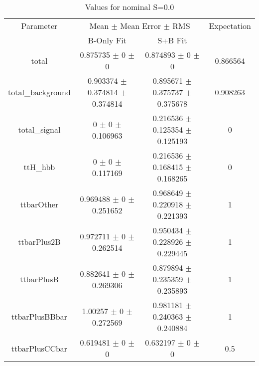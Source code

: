 \begin{table}
\centering
\caption{Values for nominal S=0.0}
\begin{tabular}{cccc}
\toprule
Parameter & \multicolumn{2}{c}{Mean $\pm$ Mean Error $\pm$ RMS} & Expectation\\
 & B-Only Fit & S+B Fit & \\
\midrule
total & \num{0.875735} $\pm$ \num{0} $\pm$ \num{0} & \num{0.874893} $\pm$ \num{0} $\pm$ \num{0} & \num{0.866564}\\
total\_background & \num{0.903374} $\pm$ \num{0.374814} $\pm$ \num{0.374814} & \num{0.895671} $\pm$ \num{0.375737} $\pm$ \num{0.375678} & \num{0.908263}\\
total\_signal & \num{0} $\pm$ \num{0} $\pm$ \num{0.106963} & \num{0.216536} $\pm$ \num{0.125354} $\pm$ \num{0.125193} & \num{0}\\
ttH\_hbb & \num{0} $\pm$ \num{0} $\pm$ \num{0.117169} & \num{0.216536} $\pm$ \num{0.168415} $\pm$ \num{0.168265} & \num{0}\\
ttbarOther & \num{0.969488} $\pm$ \num{0} $\pm$ \num{0.251652} & \num{0.968649} $\pm$ \num{0.220918} $\pm$ \num{0.221393} & \num{1}\\
ttbarPlus2B & \num{0.972711} $\pm$ \num{0} $\pm$ \num{0.262514} & \num{0.950434} $\pm$ \num{0.228926} $\pm$ \num{0.229445} & \num{1}\\
ttbarPlusB & \num{0.882641} $\pm$ \num{0} $\pm$ \num{0.269306} & \num{0.879894} $\pm$ \num{0.235359} $\pm$ \num{0.235893} & \num{1}\\
ttbarPlusBBbar & \num{1.00257} $\pm$ \num{0} $\pm$ \num{0.272569} & \num{0.981181} $\pm$ \num{0.240363} $\pm$ \num{0.240884} & \num{1}\\
ttbarPlusCCbar & \num{0.619481} $\pm$ \num{0} $\pm$ \num{0} & \num{0.632197} $\pm$ \num{0} $\pm$ \num{0} & \num{0.5}\\
\bottomrule
\end{tabular}
\end{table}